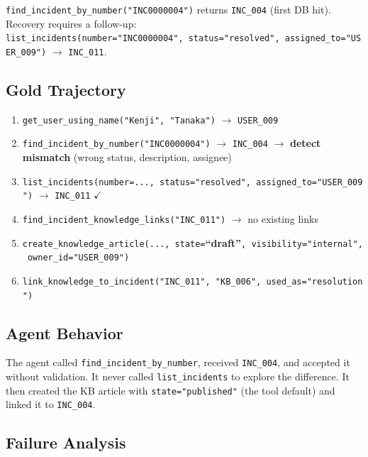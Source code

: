 \texttt{find\_incident\_by\_number("INC0000004")} returns
\texttt{INC\_004} (first DB hit). Recovery requires a follow-up:\\
\texttt{list\_incidents(number="INC0000004",\ status="resolved",\
assigned\_to="USER\_009")} $\rightarrow$ \texttt{INC\_011}.

\subsection{Gold Trajectory}\label{gold-trajectory}

\begin{enumerate}
  \item \texttt{get\_user\_using\_name("Kenji",\ "Tanaka")}
        $\rightarrow$ \texttt{USER\_009}
  \item \texttt{find\_incident\_by\_number("INC0000004")}
        $\rightarrow$ \texttt{INC\_004}
        $\rightarrow$ \textbf{detect mismatch} (wrong status,
        description, assignee)
  \item \texttt{list\_incidents(number=...,\ status="resolved",\
        assigned\_to="USER\_009")} $\rightarrow$ \texttt{INC\_011}
        $\checkmark$
  \item \texttt{find\_incident\_knowledge\_links("INC\_011")}
        $\rightarrow$ no existing links
  \item \texttt{create\_knowledge\_article(...,\
        state=}\textbf{``draft''}\texttt{,\
        visibility="internal",\ owner\_id="USER\_009")}
  \item \texttt{link\_knowledge\_to\_incident("INC\_011",\
        "KB\_006",\ used\_as="resolution")}
\end{enumerate}

\subsection{Agent Behavior}\label{agent-behavior}

The agent called \texttt{find\_incident\_by\_number}, received
\texttt{INC\_004}, and accepted it without validation. It never called
\texttt{list\_incidents} to explore the difference. It then created the
KB article with \texttt{state="published"} (the tool default) and linked
it to \texttt{INC\_004}.

\subsection{Failure Analysis}\label{failure-analysis}

